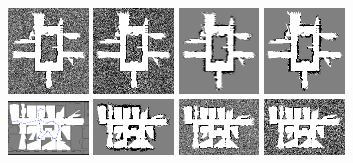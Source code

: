 \documentclass{beamer}
\begin{document}
\begin{frame}
  \includegraphics[width=0.16\textwidth]{../Data/hospital_player/SICKSlowMetropolis.png}%
  \includegraphics[width=0.16\textwidth]{../Data/hospital_player/SICKDDMCMC.png}%
  \includegraphics[width=0.16\textwidth]{../Data/hospital_player/run_belief_propagation.png}%
  \includegraphics[width=0.16\textwidth]{../Data/hospital_player/dualdecomposition.png}\\
  \includegraphics[width=0.16\textwidth]{../Data/hospital_section_player/trajectory-gt.png}%
  \includegraphics[width=0.16\textwidth, trim=0 0 0 3px, clip]{../Data/hospital_section_player/TwoAssumptionAlgo.png}%
  \includegraphics[width=0.16\textwidth, trim=0 0 0 3px, clip]{../Data/hospital_section_player/SICKSlowMetropolis.png}%
  \includegraphics[width=0.16\textwidth, trim=0 0 0 3px, clip]{../Data/hospital_section_player/SICKDDMCMC.png}%

\end{frame}
\end{document}
